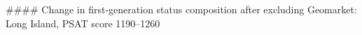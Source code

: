 #### Change in first-generation status composition after excluding Geomarket: Long Island, PSAT score 1190–1260
